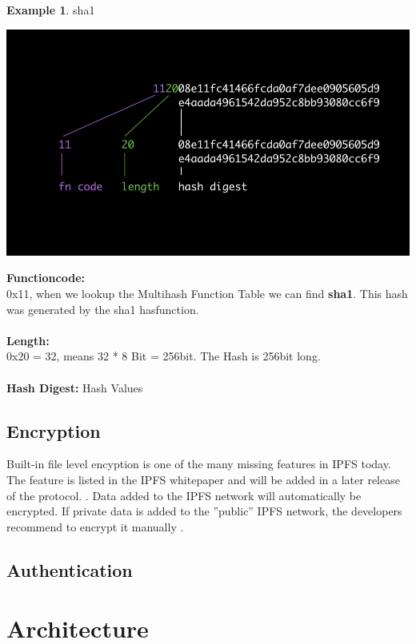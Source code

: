 \documentclass[a4paper,11pt, oneside]{report}
\theoremstyle{definition}
\newtheorem{exmp}{Example}[subsection]
\begin{document}
\begin{exmp} sha1
\begin{center}
	\includegraphics[width=\textwidth]{img/multihash_example.jpg}
\end{center}
\textbf{Functioncode:}\\
0x11, when we lookup the Multihash Function Table we can find \textbf{sha1}. This hash was generated by the sha1 hasfunction.\\ \\
\textbf{Length:}\\
0x20 = 32, means 32 * 8 Bit = 256bit. The Hash is 256bit long.\\ \\
\textbf{Hash Digest:} Hash Values 
\end{exmp}


\section{Encryption}
Built-in file level encyption is one of the many missing features in IPFS today. The feature is listed in the IPFS whitepaper and will be added in a later release of the protocol. \cite{Encryption}. Data added to the IPFS network will automatically be encrypted. If private data is added to the ''public'' IPFS network, the developers recommend to encrypt it manually \cite{EncryptionManual}.

\section{Authentication}

\newpage
 
\chapter{Architecture}
\end{document}
